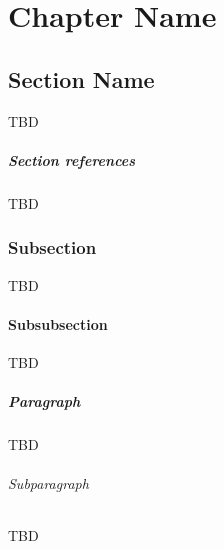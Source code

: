 \chapter{Chapter Name}

\section{Section Name}
\label{sec:one}
TBD

\paragraph{Section references}
TBD

\subsection{Subsection}
\label{sec:two}
TBD

\subsubsection{Subsubsection}
\label{sec:three}
TBD

\paragraph{Paragraph}
\label{sec:four}
TBD

\subparagraph{Subparagraph}
\label{sec:five}
TBD



